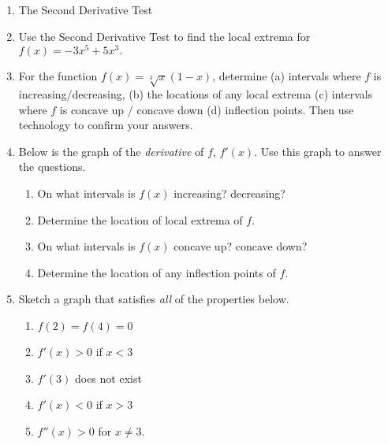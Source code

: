 \documentclass[11pt,fleqn]{article}
\begin{document}
\setlength{\parindent}{0cm}
\renewcommand{\headrulewidth}{0pt}
\newcommand{\blank}[1]{\rule{#1}{0.75pt}}
\renewcommand{\d}{\displaystyle}
\vspace*{-0.7in}
\begin{center}
 {\large{ }}
\end{center}
 \begin{enumerate}
 \item The Second Derivative Test
 \vspace{2in}
\item Use the Second Derivative Test to find the local extrema for $f(x)=-3x^5+5x^3.$
\vspace{1in}
 \item For the function $f(x)=\sqrt[3]{x}(1-x)$, determine (a) intervals where $f$ is increasing/decreasing, (b) the locations of any local extrema (c) intervals where $f$ is concave up / concave down (d) inflection points. Then use technology to confirm your answers.
 \newpage
 \item  Below is the graph of the \emph{derivative} of $f$, \large{$f'(x)$}. Use this graph to answer the questions.
 
 \begin{multicols}{2}
\quad

\vspace{.3in}
\quad

\columnbreak

\begin{enumerate}
\item On what intervals is $f(x)$ increasing? decreasing?
\vfill
\item Determine the location of local extrema of $f$.
\vfill
\item On what intervals is $f(x)$ concave up? concave down?
\vfill
\item Determine the location of any inflection points of $f$.
\vfill
\end{enumerate}
\end{multicols}
\vfill
\item Sketch a graph that satisfies \emph{all} of the properties below.
\begin{enumerate}
\item $f(2)=f(4)=0$
\item $f'(x) > 0$ if $x <3$
\item $f'(3)$ does not exist
\item $f'(x) < 0$ if $x > 3$
\item $f''(x) > 0$ for $x \not=3.$
\end{enumerate}
\vspace{2.5in}
 \end{enumerate}
\end{document}
